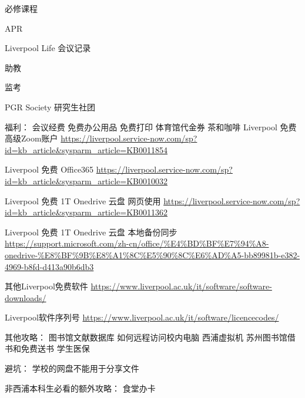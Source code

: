 \begin{overview}
\thispagestyle{empty}

必修课程

APR

Liverpool Life 会议记录

助教

监考

PGR Society 研究生社团

福利：
会议经费
免费办公用品
免费打印
体育馆代金券
茶和咖啡
Liverpool 免费高级Zoom账户 
\url{https://liverpool.service-now.com/sp?id=kb_article&sysparm_article=KB0011854}

Liverpool 免费 Office365
\url{https://liverpool.service-now.com/sp?id=kb_article&sysparm_article=KB0010032}

Liverpool 免费 1T Onedrive 云盘 网页使用
\url{https://liverpool.service-now.com/sp?id=kb_article&sysparm_article=KB0011362}

Liverpool 免费 1T Onedrive 云盘 本地备份同步
\url{https://support.microsoft.com/zh-cn/office/%E4%BD%BF%E7%94%A8-onedrive-%E8%BF%9B%E8%A1%8C%E5%90%8C%E6%AD%A5-bb89981b-e382-4969-b8fd-d413a90b6db3}

其他Liverpool免费软件
\url{https://www.liverpool.ac.uk/it/software/software-downloads/}

Liverpool软件序列号
\url{https://www.liverpool.ac.uk/it/software/licencecodes/}

其他攻略：
图书馆文献数据库
如何远程访问校内电脑
西浦虚拟机
苏州图书馆借书和免费送书
学生医保

避坑：
学校的网盘不能用于分享文件

非西浦本科生必看的额外攻略：
食堂办卡


\end{overview}
